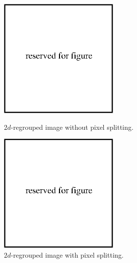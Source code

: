 \documentclass[a4paper]{jpconf}
\begin{document}
\begin{figure}[h]
\begin{minipage}{14pc}
\includegraphics[width=14pc]{name.eps}
\caption{\label{rough}$2d$-regrouped image without pixel splitting.}
\end{minipage}\hspace{2pc}%
\begin{minipage}{14pc}
\includegraphics[width=14pc]{name.eps}
\caption{\label{smooth}$2d$-regrouped image with pixel splitting.}
\end{minipage} 
\end{figure}
\end{document}
